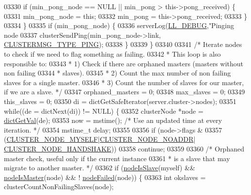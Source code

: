 \begin{DoxyCode}
{{{{{{{{{{{{{{{{{{{{{{{{{{{{{{{{{{{{{{{{{{{{{{{{{{{{{{{{{{{03330             \textcolor{keywordflow}{if} (min\_pong\_node == NULL || min\_pong > \textcolor{keyword}{this}->pong\_received) \{
03331                 min\_pong\_node = \textcolor{keyword}{this};
03332                 min\_pong = \textcolor{keyword}{this}->pong\_received;
03333             \}
03334         \}
03335         \textcolor{keywordflow}{if} (min\_pong\_node) \{
03336             serverLog(\hyperlink{server_8h_abcaffe365dee628fcf9fc90c69d534a1}{LL\_DEBUG},\textcolor{stringliteral}{"Pinging node %
03337             clusterSendPing(min\_pong\_node->link, \hyperlink{cluster_8h_aeb8a936505e22f64e5039523a3c96d4c}{CLUSTERMSG\_TYPE\_PING});
03338         \}
03339     \}
03340 
03341     \textcolor{comment}{/* Iterate nodes to check if we need to flag something as failing.}
03342 \textcolor{comment}{     * This loop is also responsible to:}
03343 \textcolor{comment}{     * 1) Check if there are orphaned masters (masters without non failing}
03344 \textcolor{comment}{     *    slaves).}
03345 \textcolor{comment}{     * 2) Count the max number of non failing slaves for a single master.}
03346 \textcolor{comment}{     * 3) Count the number of slaves for our master, if we are a slave. */}
03347     orphaned\_masters = 0;
03348     max\_slaves = 0;
03349     this\_slaves = 0;
03350     di = dictGetSafeIterator(server.cluster->nodes);
03351     \textcolor{keywordflow}{while}((de = dictNext(di)) != NULL) \{
03352         clusterNode *node = \hyperlink{dict_8h_ae8d2cc391873b2bea2b87c4f80f43120}{dictGetVal}(de);
03353         now = mstime(); \textcolor{comment}{/* Use an updated time at every iteration. */}
03354         mstime\_t delay;
03355 
03356         \textcolor{keywordflow}{if} (node->flags &
03357             (\hyperlink{cluster_8h_afee946c4e74c08465e9b4ead5e3659e6}{CLUSTER\_NODE\_MYSELF}|\hyperlink{cluster_8h_a2bbed8bf0615871a01ca8b7f691b56d8}{CLUSTER\_NODE\_NOADDR}|
      \hyperlink{cluster_8h_a60571342a067f1e5772a04b36feff6a6}{CLUSTER\_NODE\_HANDSHAKE}))
03358                 \textcolor{keywordflow}{continue};
03359 
03360         \textcolor{comment}{/* Orphaned master check, useful only if the current instance}
03361 \textcolor{comment}{         * is a slave that may migrate to another master. */}
03362         \textcolor{keywordflow}{if} (\hyperlink{cluster_8h_a3c99881f6892130c902b42b1f84a0e11}{nodeIsSlave}(myself) && \hyperlink{cluster_8h_a2d8e84269474d8750565fb3fb67aa436}{nodeIsMaster}(node) && !
      \hyperlink{cluster_8h_a6a31c614ff4f5ac8ebaa630b0a921c3d}{nodeFailed}(node)) \{
03363             \textcolor{keywordtype}{int} okslaves = clusterCountNonFailingSlaves(node);
}}}}}}}}}}}}}}}}}}}}}}}}}}}}}}}}}}}}}}}}}}}}}}}}}}}}}}}}}}}}
\end{DoxyCode}
